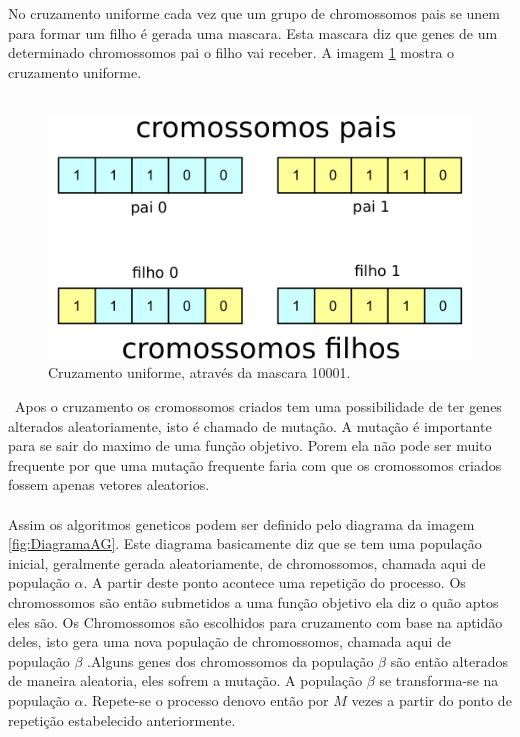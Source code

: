 \documentclass[10pt,a4paper]{article}
\begin{document}
No cruzamento uniforme cada vez que um grupo de chromossomos pais se unem para formar um filho é gerada uma mascara. Esta mascara diz que genes de um determinado chromossomos pai o filho vai receber. A imagem \ref{fig:MostrandoOCruzamentoUniforme} mostra o cruzamento uniforme. \\ \\
\begin{figure}[H]
  \center
  \includegraphics[scale=0.6]{imgs/diagramaMascara.pdf}            
  \caption{Cruzamento uniforme, através da mascara 10001.}
  \label{fig:MostrandoOCruzamentoUniforme}
\end{figure} \
Apos o cruzamento os cromossomos criados tem uma possibilidade de ter genes alterados aleatoriamente, isto é chamado de mutação. A mutação é importante para se sair do maximo de uma função objetivo. Porem ela não pode ser muito frequente por que uma mutação frequente faria com que os cromossomos criados fossem apenas vetores aleatorios.\\ \\
Assim os algoritmos geneticos podem ser definido pelo diagrama da imagem \ref{fig:DiagramaAG}. Este diagrama basicamente diz que se tem uma população inicial, geralmente gerada aleatoriamente, de chromossomos, chamada aqui de população $\alpha$. A partir deste ponto acontece uma repetição do processo. Os chromossomos são então submetidos a uma função objetivo ela diz o quão aptos eles são. Os Chromossomos são escolhidos para cruzamento com base na aptidão deles, isto gera uma nova população de chromossomos, chamada aqui de população $\beta$ .Alguns genes dos chromossomos da população $\beta$ são então alterados de maneira aleatoria, eles sofrem a mutação. A população $\beta$ se transforma-se na população $\alpha$. Repete-se o processo denovo então por $M$ vezes a partir do ponto de repetição estabelecido anteriormente.
\end{document}
